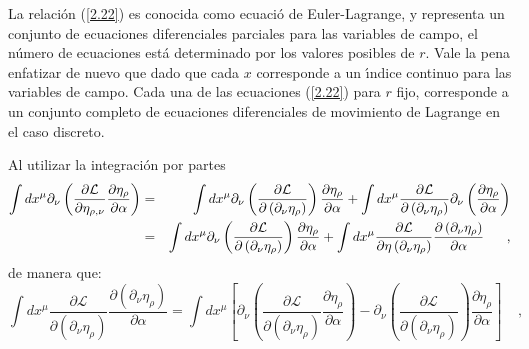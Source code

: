 La relaci\'{o}n (\ref{2.22}) es conocida como ecuaci\'{o} de
Euler-Lagrange, y representa un conjunto de ecuaciones diferenciales
parciales para las variables de campo, el n\'{u}mero de ecuaciones est\'{a} determinado por los valores posibles de $r$. Vale la pena enfatizar de nuevo que dado que cada $x$ corresponde a un \'{\i}ndice continuo para las variables de campo. Cada una de las ecuaciones (\ref{2.22}) para $r$ fijo, corresponde a un conjunto completo de ecuaciones diferenciales de movimiento de Lagrange en el caso discreto.


\begin{solution}
Al utilizar la integraci\'{o}n por partes%
\begin{eqnarray*}
\int dx^{\mu }\partial _{\nu }\left( \frac{\partial \mathcal{L}}{\partial
\eta _{\rho ,\nu }}\frac{\partial \eta _{\rho }}{\partial \alpha }\right)
&=&\int dx^{\mu }\partial _{\nu }\left( \frac{\partial \mathcal{L}}{\partial
\left( \partial _{\nu }\eta _{\rho }\right) }\right) \frac{\partial \eta
_{\rho }}{\partial \alpha }+\int dx^{\mu }\frac{\partial \mathcal{L}}{%
\partial \left( \partial _{\nu }\eta _{\rho }\right) }\partial _{\nu }\left( 
\frac{\partial \eta _{\rho }}{\partial \alpha }\right) \\
&=&\int dx^{\mu }\partial _{\nu }\left( \frac{\partial \mathcal{L}}{\partial
\left( \partial _{\nu }\eta _{\rho }\right) }\right) \frac{\partial \eta
_{\rho }}{\partial \alpha }+\int dx^{\mu }\frac{\partial \mathcal{L}}{%
\partial \eta \left( \partial _{\nu }\eta _{\rho }\right) }\frac{\partial
\left( \partial _{\nu }\eta _{\rho }\right) }{\partial \alpha }~~~~~,
\end{eqnarray*}%
de manera que:%
\begin{equation*}
\int dx^{\mu }\frac{\partial \mathcal{L}}{\partial \left( \partial _{\nu
}\eta _{\rho }\right) }\frac{\partial \left( \partial _{\nu }\eta _{\rho
}\right) }{\partial \alpha }=\int dx^{\mu }\left[ \partial _{\nu }\left( 
\frac{\partial \mathcal{L}}{\partial \left( \partial _{\nu }\eta _{\rho
}\right) }\frac{\partial \eta _{\rho }}{\partial \alpha }\right) -\partial
_{\nu }\left( \frac{\partial \mathcal{L}}{\partial \left( \partial _{\nu
}\eta _{\rho }\right) }\right) \frac{\partial \eta _{\rho }}{\partial \alpha 
}\right] ~~~~~,
\end{equation*}%

\end{solution}
